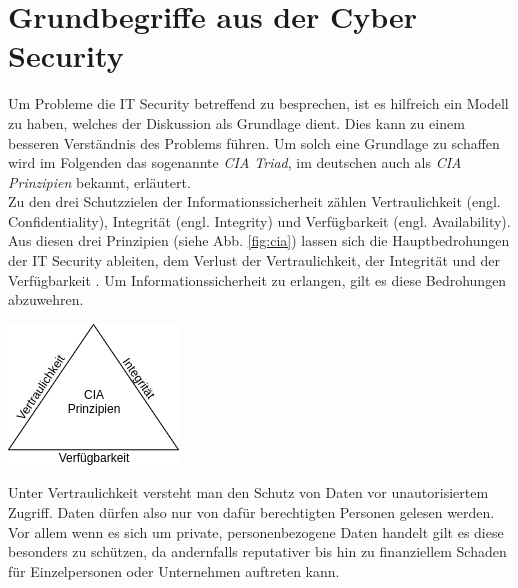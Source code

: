\documentclass[
    12pt, %
    DIV10,
    ngerman, %
    a4paper, %
    oneside, %
    titlepage, %
    parskip=half, %
    headings=normal, %
    listof=totoc, %
    bibliography=totoc, %
    index=totoc, %
    captions=tableheading, %
    final %
]{scrreprt}
\begin{document}
\section{Grundbegriffe aus der Cyber Security}
Um Probleme die IT Security betreffend zu besprechen, ist es hilfreich ein Modell zu haben, welches der Diskussion als Grundlage  dient. Dies kann zu einem besseren Verständnis des Problems führen. Um solch eine Grundlage zu schaffen wird im Folgenden das sogenannte \emph{CIA Triad}, im deutschen auch als \emph{CIA Prinzipien} bekannt, erläutert.\\
Zu den drei Schutzzielen der Informationssicherheit zählen Vertraulichkeit (engl. Confidentiality), Integrität (engl. Integrity) und Verfügbarkeit (engl. Availability). Aus diesen drei Prinzipien (siehe Abb. \ref{fig:cia}) lassen sich die Hauptbedrohungen der IT Security ableiten, dem Verlust der Vertraulichkeit, der Integrität und der Verfügbarkeit \parencite{Andress2019}.
Um Informationssicherheit zu erlangen, gilt es diese Bedrohungen abzuwehren.
\begin{center}
\includegraphics[scale=0.8]{img/cia.png}
\label{fig:cia}
\end{center}
Unter Vertraulichkeit versteht man den Schutz von Daten vor unautorisiertem Zugriff. Daten dürfen also nur von dafür berechtigten Personen gelesen werden. Vor allem wenn es sich um private, personenbezogene Daten handelt gilt es diese besonders zu schützen, da andernfalls reputativer bis hin zu finanziellem Schaden für Einzelpersonen oder Unternehmen auftreten kann.\\
\end{document}
